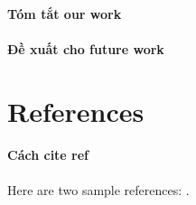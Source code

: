\documentclass[review]{elsarticle}
\begin{document}
\paragraph{Tóm tắt our work}

\paragraph{Đề xuất cho future work}



\section*{References}

\paragraph{Cách cite ref}Here are two sample references: \cite{Feynman1963118,Dirac1953888}.


\end{document}
